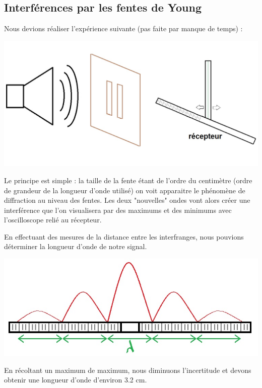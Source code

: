 \documentclass[12pt,a4paper]{article}
\begin{document}
	\subsection{Interférences par les fentes de Young}
	Nous devions réaliser l'expérience suivante (pas faite par manque de temps) :
	\begin{multicols}{2}
		\includegraphics[scale=0.28]{schem2} 
		\columnbreak
		
		Le principe est simple : la taille de la fente étant de l'ordre du centimètre (ordre de grandeur de la longueur d'onde utilisé) on voit apparaitre le phénomène de diffraction au niveau des fentes. Les deux "nouvelles" ondes vont alors créer une interférence que l'on visualisera par des maximums et des minimums avec l'oscilloscope relié au récepteur. 
	\end{multicols}
	En effectuant des mesures de la distance entre les interfranges, nous pouvions déterminer la longueur d'onde de notre signal.
	\begin{center}
		\includegraphics[scale=0.6]{schem3} 
	\end{center}
	En récoltant un maximum de maximum, nous diminuons l'incertitude et devons obtenir une longueur d'onde d'environ 3.2 cm.
	
\end{document}
